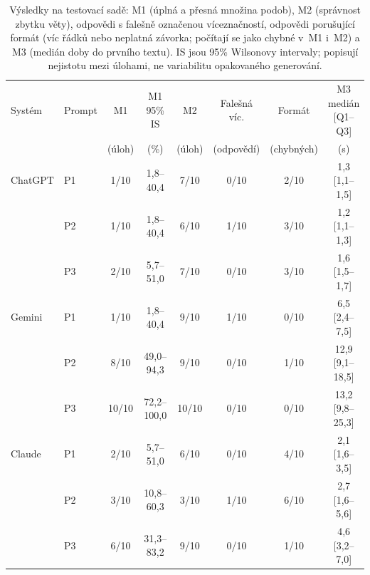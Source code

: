 
\begin{table}[htbp]
\centering\small
\caption{Výsledky na testovací sadě: M1 (úplná a přesná množina podob), M2 (správnost zbytku věty), odpovědi s falešně označenou víceznačností, odpovědi porušující formát (víc řádků nebo neplatná závorka; počítají se jako chybné v~M1 i~M2) a M3 (medián doby do prvního textu). IS jsou 95\% Wilsonovy intervaly; popisují nejistotu mezi úlohami, ne variabilitu opakovaného generování.}
\label{tab:vysledky}
\begin{tabular}{@{}llcccccc@{}}
\toprule
Systém & Prompt & M1 & M1 95\% IS & M2 & Falešná víc. & Formát & M3 medián [Q1--Q3] \\
 & & (úloh) & (\%) & (úloh) & (odpovědí) & (chybných) & (s) \\
\midrule
ChatGPT & P1 & 1/10 & 1{,}8--40{,}4 & 7/10 & 0/10 & 2/10 & 1{,}3 [1{,}1--1{,}5] \\
 & P2 & 1/10 & 1{,}8--40{,}4 & 6/10 & 1/10 & 3/10 & 1{,}2 [1{,}1--1{,}3] \\
 & P3 & 2/10 & 5{,}7--51{,}0 & 7/10 & 0/10 & 3/10 & 1{,}6 [1{,}5--1{,}7] \\
\addlinespace
Gemini & P1 & 1/10 & 1{,}8--40{,}4 & 9/10 & 1/10 & 0/10 & 6{,}5 [2{,}4--7{,}5] \\
 & P2 & 8/10 & 49{,}0--94{,}3 & 9/10 & 0/10 & 1/10 & 12{,}9 [9{,}1--18{,}5] \\
 & P3 & 10/10 & 72{,}2--100{,}0 & 10/10 & 0/10 & 0/10 & 13{,}2 [9{,}8--25{,}3] \\
\addlinespace
Claude & P1 & 2/10 & 5{,}7--51{,}0 & 6/10 & 0/10 & 4/10 & 2{,}1 [1{,}6--3{,}5] \\
 & P2 & 3/10 & 10{,}8--60{,}3 & 3/10 & 1/10 & 6/10 & 2{,}7 [1{,}6--5{,}6] \\
 & P3 & 6/10 & 31{,}3--83{,}2 & 9/10 & 0/10 & 1/10 & 4{,}6 [3{,}2--7{,}0] \\
\bottomrule
\end{tabular}
\end{table}

